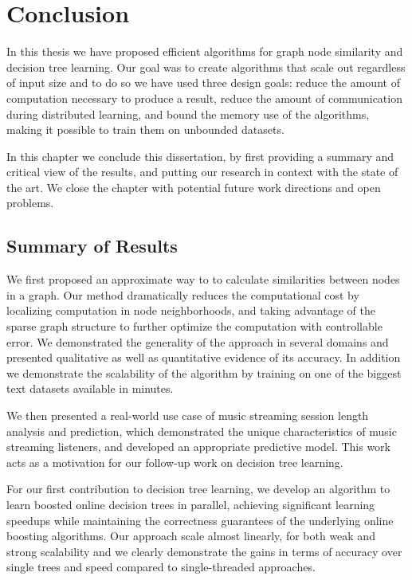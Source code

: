 \chapter{Conclusion}

In this thesis we have proposed efficient algorithms for graph node
similarity and decision tree learning. Our goal was to create
algorithms that scale out regardless of input size and to do so
we have used three design goals: reduce the amount of computation
necessary to produce a result, reduce the amount of communication
during distributed learning, and bound the memory use of the algorithms,
making it possible to train them on unbounded datasets.

In this chapter we conclude this dissertation, by first providing a
summary and critical view of the results, and putting our research
in context with the state of the art.
We close the chapter with potential future work directions and open
problems.

\section{Summary of Results}

We first proposed an approximate way to to calculate similarities between
nodes in a graph. Our method dramatically reduces the computational cost
by localizing computation in node neighborhoods, and taking advantage
of the sparse graph structure to further optimize the computation with controllable
error. We demonstrated the generality of the approach in several domains and presented
qualitative as well as quantitative evidence of its accuracy. In addition we demonstrate
the scalability of the algorithm by training on one of the biggest text datasets
available in minutes.

We then presented a real-world use case of music streaming session length analysis and prediction,
which demonstrated the unique characteristics of music streaming listeners, and developed
an appropriate predictive model. This work acts as a motivation for our follow-up work
on decision tree learning.

For our first contribution to decision tree learning, we develop an algorithm
to learn boosted online decision trees in parallel, achieving significant
learning speedups while maintaining the correctness guarantees of the
underlying online boosting algorithms. Our approach scale almost linearly,
for both weak and strong scalability and we clearly demonstrate the gains
in terms of accuracy over single trees and speed compared to single-threaded
approaches.

